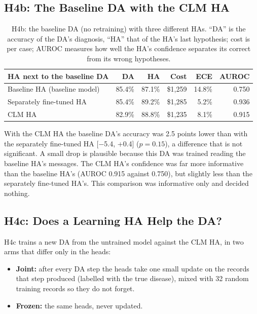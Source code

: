 \documentclass[11pt]{article}
\begin{document}
\subsection*{H4b: The Baseline DA with the CLM HA}

\begin{table}[ht]
  \centering
  \caption{H4b: the baseline DA (no retraining) with three different HAs.
  ``DA'' is the accuracy of the DA's diagnosis, ``HA'' that of the HA's last
  hypothesis; cost is per case; AUROC measures how well the HA's confidence
  separates its correct from its wrong hypotheses.}
  \label{tab:h4b}
  \small
  \begin{tabular}{lrrrrr}
    \toprule
    HA next to the baseline DA & DA & HA & Cost & ECE & AUROC \\
    \midrule
    Baseline HA (baseline model) & 85.4\% & 87.1\% & \$1,259 & 14.8\% & 0.750 \\
    Separately fine-tuned HA & 85.4\% & 89.2\% & \$1,285 & 5.2\% & 0.936 \\
    CLM HA & 82.9\% & 88.8\% & \$1,235 & 8.1\% & 0.915 \\
    \bottomrule
  \end{tabular}
\end{table}

With the CLM HA the baseline DA's accuracy was 2.5 points lower than with the
separately fine-tuned HA [$-$5.4, +0.4] ($p = 0.15$), a difference that is not
significant. A small drop is plausible because this DA was trained reading the
baseline HA's messages. The CLM HA's confidence was far more informative than the
baseline HA's (AUROC 0.915 against 0.750), but slightly less than the
separately fine-tuned HA's. This comparison was informative only and decided nothing.

\subsection*{H4c: Does a Learning HA Help the DA?}

H4c trains a new DA from the untrained model against the CLM HA, in two arms
that differ only in the heads:

\begin{itemize}
  \item \textbf{Joint:} after every DA step the heads take one small update on
        the records that step produced (labelled with the true disease), mixed
        with 32 random training records so they do not forget.
  \item \textbf{Frozen:} the same heads, never updated.
\end{itemize}
\end{document}
